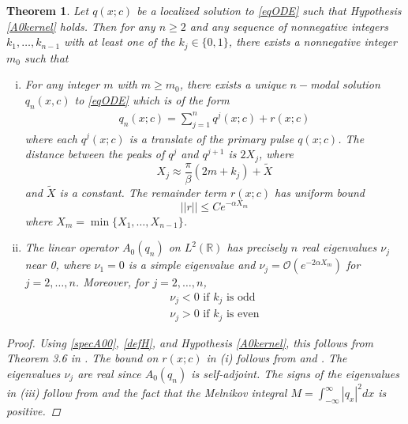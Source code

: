 \documentclass[12pt]{article}
\def\R{{\mathbb R}}
\newtheorem{theorem}{Theorem}
\begin{document}
\begin{theorem}\label{multiexist}
Let $q(x; c)$ be a localized solution to \eqref{eqODE} such that Hypothesis \ref{A0kernel} holds. Then for any $n \geq 2$ and any sequence of nonnegative integers $k_1, \dots, k_{n-1}$ with at least one of the $k_j \in \{0, 1 \}$, there exists a nonnegative integer $m_0$ such that
\begin{enumerate}[(i)]
	\item For any integer $m$ with $m \geq m_0$, there exists a unique $n-$modal solution $q_n(x, c)$ to \eqref{eqODE} which is of the form
	\begin{align}\label{qn}
	q_n(x; c) = \sum_{j = 1}^{n} q^j(x; c) + r(x; c)
	\end{align}
	where each $q^j(x; c)$ is a translate of the primary pulse $q(x; c)$. The distance between the peaks of $q^j$ and $q^{j+1}$ is $2 X_j$, where
	\begin{equation}
	X_j \approx \frac{\pi}{\beta}(2 m + k_j) + \tilde{X}
	\end{equation}
	and $\tilde{X}$ is a constant. The remainder term $r(x; c)$ has uniform bound
	\begin{equation}\label{rbound}
	||r|| \leq C e^{-\alpha X_m}
	\end{equation}
	where $X_m = \min\{X_1, \dots, X_{n-1}\}$.
	\item The linear operator $A_0(q_n)$ on $L^2(\R)$ has precisely $n$ real eigenvalues $\nu_j$ near 0, where $\nu_1 = 0$ is a simple eigenvalue and $\nu_j = \mathcal{O}(e^{-2\alpha X_m})$ for $j = 2, \dots, n$. Moreover, for $j = 2, \dots, n$,
	\begin{align*}
	\nu_j < 0 \text{ if } k_j \text{ is odd} \\
	\nu_j > 0 \text{ if } k_j \text{ is even} 
	\end{align*}
\end{enumerate}

\begin{proof}
Using \eqref{specA00}, \eqref{defH}, and Hypothesis \ref{A0kernel}, this follows from Theorem 3.6 in \cite{Sandstede1997}. The bound on $r(x; c)$ in (i) follows from \cite{Sanstede1993} and \cite{Sandstede1998}. The eigenvalues $\nu_j$ are real since $A_0(q_n)$ is self-adjoint. The signs of the eigenvalues in (iii) follow from \cite{Sandstede1997} and the fact that the Melnikov integral $M = \int_{-\infty}^\infty |q_x|^2 dx$ is positive.
\end{proof}
\end{theorem}
\end{document}
